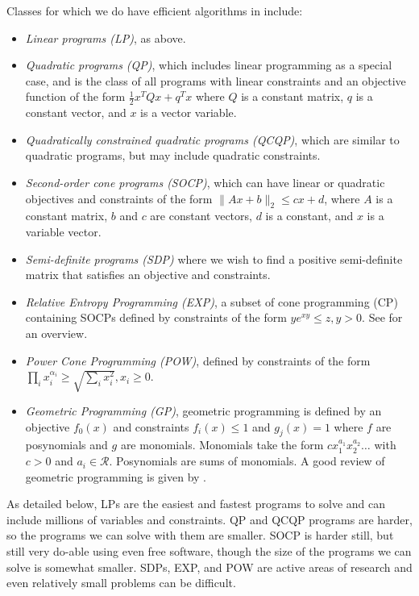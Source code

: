 \documentclass{article}
\begin{document}
Classes for which we do have efficient algorithms in include:
\begin{itemize}
\item \textit{Linear programs (LP)}, as above.
\item \textit{Quadratic programs (QP)}, which includes linear programming as a special case, and is the class of all programs with linear constraints and an objective function of the form $\frac{1}{2}x^T Q x + q^T x$ where $Q$ is a constant matrix, $q$ is a constant vector, and $x$ is a vector variable.
\item \textit{Quadratically constrained quadratic programs (QCQP)}, which are similar to quadratic programs, but may include quadratic constraints.
\item \textit{Second-order cone programs (SOCP)}, which can have linear or quadratic objectives and constraints of the form $\lVert Ax+b\rVert_2 \le cx+d$, where $A$ is a constant matrix, $b$ and $c$ are constant vectors, $d$ is a constant, and $x$ is a variable vector.
\item \textit{Semi-definite programs (SDP)} where we wish to find a positive semi-definite matrix that satisfies an objective and constraints.
\item \textit{Relative Entropy Programming (EXP)}, a subset of cone programming (CP) containing SOCPs defined by constraints of the form $ye^{xy}\le z, y>0$. See \citet{Chandrasekaran2017} for an overview.
\item \textit{Power Cone Programming (POW)}, defined by constraints of the form $\prod_i x_i^{\alpha_i} \ge \sqrt{\sum_i x_i^2}, x_i\ge0$. %
\item \textit{Geometric Programming (GP)}, geometric programming is defined by an objective $f_0(x)$ and constraints $f_i(x)\le1$ and $g_j(x)=1$ where $f$ are posynomials and $g$ are monomials. Monomials take the form $c x_1^{a_1} x_2^{a_2}\ldots$ with $c>0$ and $a_i\in\mathcal{R}$. Posynomials are sums of monomials. A good review of geometric programming is given by \citet{Boyd2007}.
\end{itemize}

As detailed below, LPs are the easiest and fastest programs to solve and can include millions of variables and constraints. QP and QCQP programs are harder, so the programs we can solve with them are smaller. SOCP is harder still, but still very do-able using even free software, though the size of the programs we can solve is somewhat smaller. SDPs, EXP, and POW are active areas of research and even relatively small problems can be difficult.
\end{document}
